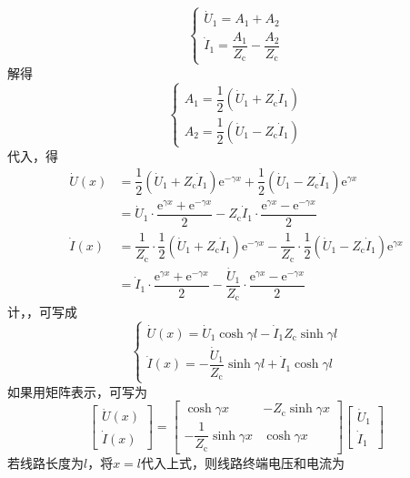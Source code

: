 \[
\begin{cases}
\dot{U}_1 = A_1 + A_2 \\
\dot{I}_1 = \dfrac{A_1}{Z_{\mathrm{c}}} - \dfrac{A_2}{Z_{\mathrm{c}}}
\end{cases}
\]
解得
\[
\begin{cases}
A_1 = \dfrac{1}{2}\left(\dot{U}_1 + Z_{\mathrm{c}} \dot{I}_1\right) \\
A_2 = \dfrac{1}{2}\left(\dot{U}_1 - Z_{\mathrm{c}} \dot{I}_1\right)
\end{cases}
\]
代入，得
\[
\begin{aligned}
\dot{U}(x) &= \dfrac{1}{2}\left(\dot{U}_1 + Z_{\mathrm{c}} \dot{I}_1\right)\mathrm{e}^{-\gamma x} + \dfrac{1}{2}\left(\dot{U}_1 - Z_{\mathrm{c}} \dot{I}_1\right)\mathrm{e}^{\gamma x} \\
&= \dot{U}_1 \cdot \dfrac{\mathrm{e}^{\gamma x} + \mathrm{e}^{-\gamma x}}{2} - Z_{\mathrm{c}} \dot{I}_1 \cdot \dfrac{\mathrm{e}^{\gamma x} - \mathrm{e}^{-\gamma x}}{2} \\
\dot{I}(x) &= \dfrac{1}{Z_{\mathrm{c}}} \cdot \dfrac{1}{2}\left(\dot{U}_1 + Z_{\mathrm{c}} \dot{I}_1\right)\mathrm{e}^{-\gamma x} - \dfrac{1}{Z_{\mathrm{c}}} \cdot \dfrac{1}{2}\left(\dot{U}_1 - Z_{\mathrm{c}} \dot{I}_1\right)\mathrm{e}^{\gamma x} \\
&= \dot{I}_1 \cdot \dfrac{\mathrm{e}^{\gamma x} + \mathrm{e}^{-\gamma x}}{2} - \dfrac{\dot{U}_1}{Z_{\mathrm{c}}} \cdot \dfrac{\mathrm{e}^{\gamma x} - \mathrm{e}^{-\gamma x}}{2}
\end{aligned}
\]
计，，可写成
\[
\begin{cases}
\dot{U}(x) = \dot{U}_1 \cosh \gamma l - \dot{I}_1 Z_{\mathrm{c}} \sinh \gamma l \\
\dot{I}(x) = -\dfrac{\dot{U}_1}{Z_{\mathrm{c}}} \sinh \gamma l + \dot{I}_1 \cosh \gamma l
\end{cases}
\]
如果用矩阵表示，可写为
\[
\begin{bmatrix}
\dot{U}(x) \\
\dot{I}(x)
\end{bmatrix}
=
\begin{bmatrix}
\cosh \gamma x & -Z_{\text{c}} \sinh \gamma x \\
-\dfrac{1}{Z_{\text{c}}} \sinh \gamma x & \cosh \gamma x
\end{bmatrix}
\begin{bmatrix}
\dot{U}_1 \\
\dot{I}_1
\end{bmatrix}
\]
若线路长度为$l$，将$x=l$代入上式，则线路终端电压和电流为
